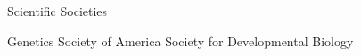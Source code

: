 \begin{rubric}{Scientific Societies}

\entry*[2014--\ldots]
  Genetics Society of America
\entry*[2015--\ldots]
  Society for Developmental Biology

\end{rubric}
